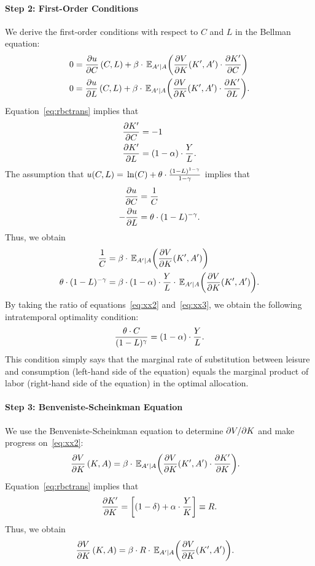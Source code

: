 \documentclass[letterpaper,12pt,leqno]{article}
\begin{document}
\paragraph{Step 2: First-Order Conditions} We derive the first-order conditions with respect to $C$ and $L$ in the Bellman equation:
\begin{align*}
0&= \pd{u}{C}\bp{C,L} +\b \cdot \E[A'|A]{\pd{V}{K}(K',A')\cdot \pd{ K'}{ C}}\\
0&=\pd{u}{L}\bp{C,L} +\b\cdot \E[A'|A]{\pd{V}{K}(K',A')\cdot \pd{ K'}{ L}}.
\end{align*}
Equation~\eqref{eq:rbctrans} implies that
\begin{align*}
\frac{\partial  K'}{\partial  C}&=-1\\
\frac{\partial  K'}{\partial  L}&=(1-\alpha)\cdot \frac{Y}{L}.
\end{align*}
The assumption that $u(C,L)=\ln{C}+\t\cdot \frac{(1-L)^{1-\g}}{1-\g}$ implies that
\begin{align*}
\frac{\partial u}{\partial C}&=\frac{1}{C}\\
-\frac{\partial u}{\partial L}&=\theta \cdot (1-L)^{-\gamma}.
\end{align*}
Thus, we obtain
\begin{align}
\frac{1}{C}&=\b\cdot \E[A'|A]{\pd{V}{K}(K',A')} \label{eq:xx2}\\
\t \cdot (1-L)^{-\g}&=\b\cdot\bp{1-\a}\cdot \frac{Y}{L}\cdot \E[A'|A]{\pd{V}{K}(K',A')}\label{eq:xx3}.
\end{align}
By taking the ratio of equations~\eqref{eq:xx2} and~\eqref{eq:xx3},  we obtain the following intratemporal optimality condition:
\begin{equation}
\frac{\theta \cdot C}{(1-L)^{\gamma}}=(1-\alpha) \cdot \frac{Y}{L} \label{eq:intra}.
\end{equation}
This condition simply says that the marginal rate of substitution between leisure and consumption (left-hand side of the equation) equals the marginal product of labor (right-hand side of the equation) in the optimal allocation.

\paragraph{Step 3: Benveniste-Scheinkman Equation} We use the Benveniste-Scheinkman equation to determine $\partial V/\partial K$ and make progress on~\eqref{eq:xx2}: 
\begin{align*}
\pd{V}{K}\bp{K,A} &  =\b\cdot \E[A'|A]{\pd{V}{K}(K',A') \cdot  \pd{ K'}{ K}}.
\end{align*}
Equation~\eqref{eq:rbctrans} implies that
\[\frac{\partial  K'}{\partial  K}= \left[ (1-\delta)+\alpha  \cdot \frac{Y}{K} \right]\equiv R.\]
Thus, we obtain 
\begin{align}
\pd{V}{K}\bp{K,A}&  =\b\cdot  R\cdot \E[A'|A]{\pd{V}{K}(K',A')}\label{eq:xx1}.
\end{align}
\end{document}
